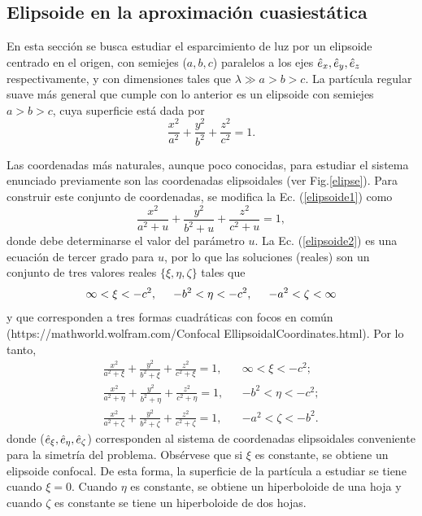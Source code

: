 \subsection{Elipsoide en la aproximación cuasiestática}
En esta sección se busca estudiar el esparcimiento de luz por un elipsoide centrado en el origen, con semiejes ($a,b,c$) paralelos a los ejes $\hat{e}_{x},\hat{e}_{y},\hat{e}_{z}$ respectivamente, y con dimensiones tales que $\lambda\gg a>b>c$. La partícula regular suave más general que cumple con lo anterior es un elipsoide con semiejes $a > b > c$, cuya superficie está dada por 
\begin{equation}
    \frac{x^2}{a^2}+\frac{y^2}{b^2}+\frac{z^2}{c^2}=1.
    \label{elipsoide1}
\end{equation}

Las coordenadas más naturales, aunque poco conocidas, para estudiar el sistema enunciado previamente son las coordenadas elipsoidales (ver Fig.\ref{elipse}). Para construir este conjunto de coordenadas, se modifica la Ec. (\ref{elipsoide1}) como 
\begin{equation}
	\frac{x^2}{a^2+u}+\frac{y^2}{b^2+u}+\frac{z^2}{c^2+u}=1,
	\label{elipsoide2}
\end{equation}
 donde debe determinarse el valor del parámetro $u$. La Ec. (\ref{elipsoide2}) es una ecuación de tercer grado para $u$, por lo que las soluciones (reales) son un conjunto de tres valores reales $\{\xi,\eta,\zeta\}$ tales que
\begin{equation}
	\infty<\xi<-c^2,\hspace{0.5cm}-b^2<\eta<-c^2,\hspace{0.5cm}-a^2<\zeta<\infty
\end{equation}
y que corresponden a tres formas cuadráticas con focos en común (https://mathworld.wolfram.com/Confocal EllipsoidalCoordinates.html). Por lo tanto,
\begin{align}
    \frac{x^2}{a^2+\xi}+\frac{y^2}{b^2+\xi}+\frac{z^2}{c^2+\xi}=1,&& \infty<\xi<-c^2;\\
    \frac{x^2}{a^2+\eta}+\frac{y^2}{b^2+\eta}+\frac{z^2}{c^2+\eta}=1,&& -b^2<\eta<-c^2;\\
    \frac{x^2}{a^2+\zeta}+\frac{y^2}{b^2+\zeta}+\frac{z^2}{c^2+\zeta}=1,&& -a^2<\zeta<-b^2.
\end{align}
donde ($\hat{e}_{\xi},\hat{e}_{\eta},\hat{e}_{\zeta}$) corresponden al sistema de coordenadas elipsoidales  conveniente para la simetría del problema. Obsérvese que si $\xi$ es constante, se obtiene un elipsoide confocal. De esta forma, la superficie de la partícula a estudiar se tiene cuando $\xi=0$. Cuando $\eta$ es constante, se obtiene un hiperboloide de una hoja y cuando $\zeta$ es constante se tiene un hiperboloide de dos hojas.\\

